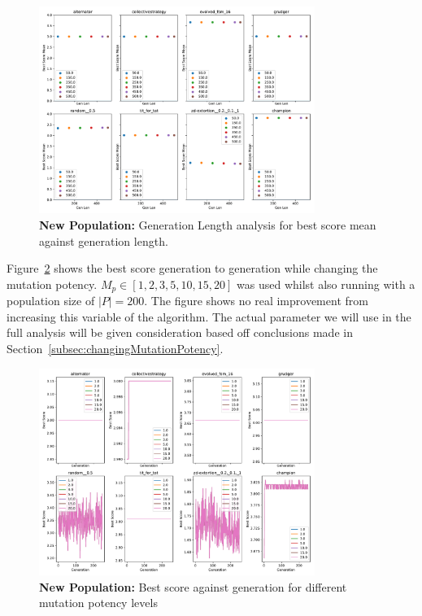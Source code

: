\begin{figure}[h]
    \includegraphics[width=0.8\textwidth, keepaspectratio, center]{./img/plots/NEW_GEN_bs_v_gen_all.pdf}
    \caption{\textbf{New Population:} Generation Length analysis for best score mean against generation length.}\label{fig:NEW-GEN-bs-v-gen-all}
\end{figure}

Figure~\ref{fig:NEW-MUT-POT-bs-v-gen-all} shows the best score generation to generation while changing the mutation potency.
\(M_p \in [1,2,3,5,10,15,20] \) was used whilst also running with a population size of \(|P|=200\).
The figure shows no real improvement from increasing this variable of the algorithm.
The actual parameter we will use in the full analysis will be given consideration based off conclusions made in Section~\ref{subsec:changingMutationPotency}.

\begin{figure}[h]
    \includegraphics[width=0.8\textwidth, keepaspectratio, center]{./img/plots/NEW_MUT_POT_bs_v_gen_all.pdf}
    \caption{\textbf{New Population:} Best score against generation for different mutation potency levels}\label{fig:NEW-MUT-POT-bs-v-gen-all}
\end{figure}


